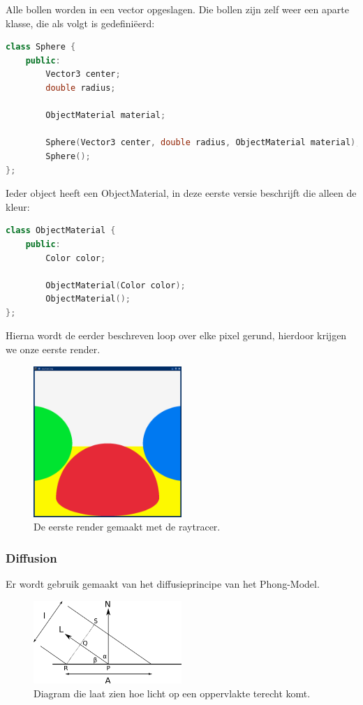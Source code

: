 \documentclass[12pt, a4paper]{article}
\begin{document}
Alle bollen worden in een vector opgeslagen. Die bollen zijn zelf weer een aparte klasse, die als volgt is gedefiniëerd:

\begin{lstlisting}[language=C++]
class Sphere {
    public:
        Vector3 center;
        double radius;

        ObjectMaterial material;

        Sphere(Vector3 center, double radius, ObjectMaterial material);
        Sphere();
};
\end{lstlisting}

Ieder object heeft een ObjectMaterial, in deze eerste versie beschrijft die alleen de kleur:

\begin{lstlisting}[language=C++]
class ObjectMaterial {
    public: 
        Color color;

        ObjectMaterial(Color color);
        ObjectMaterial();
};
\end{lstlisting}

Hierna wordt de eerder beschreven loop over elke pixel gerund, hierdoor krijgen we onze eerste render.
\begin{figure}[H]
    \centering
    \includegraphics[width=0.50\textwidth]{renders/first_raytraced.png}
    \caption{De eerste render gemaakt met de raytracer.}
    \label{fig:first_raytraced}
\end{figure}

\subsubsection{Diffusion}
Er wordt gebruik gemaakt van het diffusieprincipe van het Phong-Model. 

\begin{figure}[H]
    \centering
    \includegraphics[width=0.50\textwidth]{diffuse-diagram.png}
    \caption{Diagram die laat zien hoe licht op een oppervlakte terecht komt.}
    \label{fig:diffuse-diagram}
\end{figure}
\end{document}
